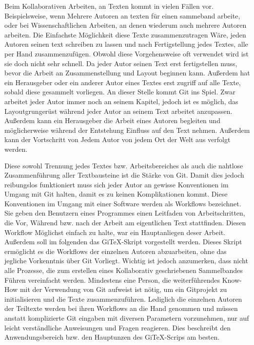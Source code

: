 \documentclass[12pt,a4paper]{scrartcl}
\begin{document}
Beim Kollaborativen Arbeiten, an Texten kommt in vielen Fällen vor. Beispielsweise, wenn Mehrere Autoren an texten für einen sammeband arbeite, oder bei Wissenschaftlichen Arbeiten, an denen wiederum auch mehrere Autoren arbeiten. Die Einfachste Möglichkeit diese Texte zusammenzutragen Wäre, jeden Autoren seinen text schreiben zu lassen und nach Fertigstellung jedes Textes, alle per Hand zusammenzufügen. Obwohl diese Vorgehensweise oft verwendet wird ist sie doch nicht sehr schnell. Da jeder Autor seinen Text erst fertigstellen muss, bevor die Arbeit an Zusammenstellung und Layout beginnen kann. Außerdem hat ein Herausgeber oder ein anderer Autor eines Textes erst zugriff auf alle Texte, sobald diese gesammelt vorliegen. An dieser Stelle kommt Git ins Spiel. Zwar arbeitet jeder Autor immer noch an seinem Kapitel, jedoch ist es möglich, das Layoutgrungerüst während jeder Autor an seinem Text arbeitet anzupassen. Außerdem kann ein Herausgeber die Arbeit eines Autoren begleiten und möglicherweise während der Entstehung Einfluss auf den Text nehmen. Außerdem kann der Vortschritt von Jedem Autor von jedem Ort der Welt aus verfolgt werden.

Diese sowohl Trennung jedes Textes bzw. Arbeitsbereiches als auch die nahtlose Zusammenführung aller Textbausteine ist die Stärke von Git. Damit dies jedoch reibungslos funktioniert muss sich jeder Autor an gewisse Konventionen im Umgang mit Git halten, damit es zu keinen Komplikationen kommt. Diese Konventionen im Umgang mit einer Software werden als Workflows bezeichnet. Sie geben den Benutzern eines Programmes einen Leitfaden von Arbeitschritten, die Vor, Während bzw. nach der Arbeit am eigentlichen Text stattfinden. Diesen Workflow Möglichst einfach zu halte, war ein Hauptanliegen deser Arbeit. Außerdem soll im folgenden das GiTeX-Skript vorgestellt werden. Dieses Skript ermöglicht es die Workflows der einzelnen Autoren abzuarbeiten, ohne das jegliche Vorkenntnis über Git Vorliegt. Wichtig ist jedoch anzumerken, dass nicht alle Prozesse, die zum erstellen eines Kollaborativ geschriebenen Sammelbandes Führen vereinfacht werden. Mindestens eine Person, die weiterführendes Know-How mit der Verwendung von Git aufweist ist nötig, um ein Gitprojekt zu initialisieren und die Texte zusammenzuführen. Lediglich die einzelnen Autoren der Teiltexte werden bei ihren Workflows an die Hand genommen und müssen anstatt komplizierte Git eingaben mit diversen Parametern vorzunehmen, nur auf leicht verständliche Anweisungen und Fragen reagieren. Dies beschreibt den Anwendungsbereich bzw. den Hauptunzen des GiTeX-Scrips am besten.
\end{document}
